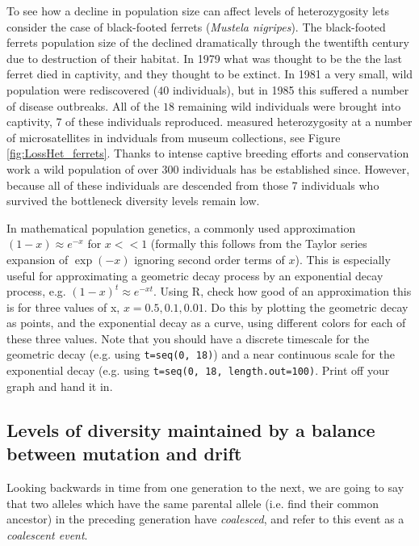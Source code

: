 To see how a decline in population size can affect levels of
heterozygosity lets consider the case of black-footed ferrets ({\it Mustela
  nigripes}). The black-footed ferrets population size of the declined dramatically through the twentifth century due
to destruction of their habitat.  In 1979 what was thought to
be the the last ferret died in captivity, and they thought to be
extinct. In 1981 a very small, wild population were rediscovered ($40$ individuals), but in 1985 this
suffered a number of disease outbreaks. All of the $18$ remaining wild individuals
were brought into captivity, 7 of these individuals
reproduced. \citeauthor{Wisely:02} measured heterozygosity at a number
of microsatellites in indviduals from museum collections, see Figure \ref{fig:LossHet_ferrets}.
Thanks to intense captive breeding efforts and conservation work a
wild population of over 300 individuals has be established
since. However, because all of these individuals are descended from
those 7 individuals who survived the bottleneck diversity levels
remain low. 


\begin{question} \label{geo_question} In mathematical population genetics, a
  commonly used approximation $(1-x) \approx e^{-x}$ for $x << 1$ (formally
  this follows from the Taylor series expansion of $\exp(-x)$ ignoring second
  order terms of $x$).  This is especially useful for approximating a geometric
  decay process by an exponential decay process, e.g. $(1 - x)^t \approx
  e^{-xt}$. Using R, check how good of an approximation this is for three
  values of x, $x = 0.5, 0.1, 0.01$. Do this by plotting the geometric decay as
  points, and the exponential decay as a curve, using different colors for each
  of these three values. Note that you should have a discrete timescale for the
  geometric decay (e.g. using \texttt{t=seq(0, 18)}) and a near continuous scale
  for the exponential decay (e.g. using \texttt{t=seq(0, 18, length.out=100)}.
  Print off your graph and hand it in. 

\end{question}

\subsection{Levels of diversity maintained by a balance between
 mutation and drift} \label{DriftMutationBalance}
Looking backwards in time from one generation to the next, we are going to say
that two alleles which have the same parental allele (i.e. find their common
ancestor) in the preceding generation have \emph{coalesced}, and refer to this
event as a \emph{coalescent event}.


